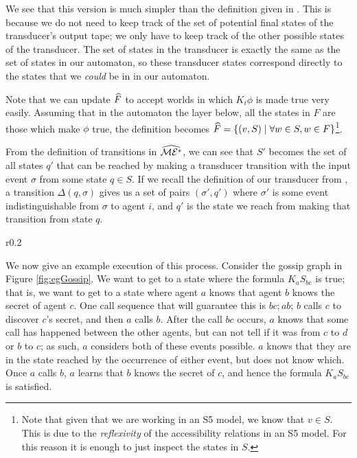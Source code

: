 \documentclass[10pt, a4paper]{report}
\begin{document}
We see that this version is much simpler than the definition given in
. This is because we do not need to keep track of the
set of potential final states of the transducer's output tape; we only have to
keep track of the other possible states of the transducer. The set of states in
the transducer is exactly the same as the set of states in our \mestar automaton,
so these transducer states correspond directly to the states that we
\emph{could} be in in our \mestar automaton.

Note that we can update $\widehat{F}$ to accept worlds in which $K_i \phi$ is made
true very easily. Assuming that in the automaton the layer below, all the states
in $F$ are those which make $\phi$ true, the definition becomes $\widehat{F} =
\left\{ (v, S) \mid \forall w \in S, w \in F \right\}$\footnote{Note that given
  that we are working in an \textsf{S5} model, we know that $v \in S$. This is
  due to the \emph{reflexivity} of the accessibility relations in an \textsf{S5}
model. For this reason it is enough to just inspect the states in $S$.}.

From the definition of transitions in $\widehat{\mathcal{ME^\ast}}$, we can see that $S'$
becomes the set of all states $q'$ that can be reached by making a transducer
transition with the input event $\sigma$ from some state $q \in S$. If we recall
the definition of our transducer from , a
transition $\Delta(q, \sigma)$ gives us a set of pairs $(\sigma', q')$ where
$\sigma'$ is some event indistinguishable from $\sigma$ to agent $i$, and $q'$
is the state we reach from making that transition from state $q$.

\begin{wrapfigure}{r}{0.2\textwidth}
  \centering
  \caption{}
  \label{fig:egGossip}
\end{wrapfigure}

We now give an example execution of this process. Consider the gossip graph in
Figure \ref{fig:egGossip}. We want to get to a state where the formula $K_a
S_{bc}$ is true; that is, we want to get to a state where agent $a$ knows that
agent $b$ knows the secret of agent $c$. One call sequence that will guarantee
this is $bc; ab$; $b$ calls $c$ to discover $c$'s secret, and then $a$ calls
$b$. After the call $bc$ occurs, $a$ knows that some call has happened between
the other agents, but can not tell if it was from $c$ to $d$ or $b$ to $c$; as
such, $a$ considers both of these events possible. $a$ knows that they are in
the state reached by the occurrence of either event, but does not know which.
Once $a$ calls $b$, $a$ learns that $b$ knows the secret of $c$, and hence the
formula $K_a S_{bc}$ is satisfied. 
\end{document}
